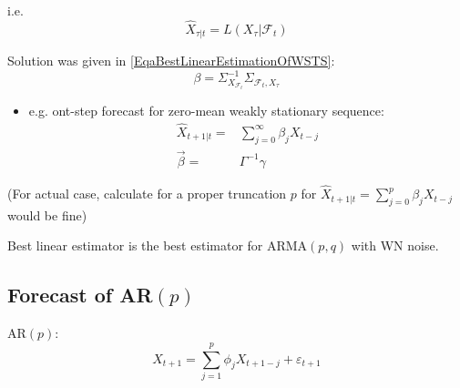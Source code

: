     i.e. 
    \begin{equation}
        \hat{X}_{\tau|t}=L(X_\tau|\mathscr{F}_t) 
    \end{equation}
    
    Solution was given in \autoref{EqaBestLinearEstimationOfWSTS}:
    \begin{equation}
        \beta =\Sigma _{X_{\mathscr{F}_t}}^{-1}\Sigma _{\mathscr{F}_t,X_{\tau}}
    \end{equation}

    \begin{itemize}[topsep=2pt,itemsep=0pt]
        \item e.g. ont-step forecast for zero-mean weakly stationary sequence:
    \begin{align}
        \hat{X}_{t+1|t}=&\sum_{j=0}^\infty \beta _jX_{t-j}\\
        \vec{\beta }=&\Gamma^{-1}\gamma 
    \end{align}
    \end{itemize}
    
    (For actual case, calculate for a proper truncation $ p $ for $ \hat{X}_{t+1|t}=\sum_{j=0}^p\beta _jX_{t-j} $ would be fine)
        
    

    Best linear estimator is the best estimator for ARMA$ (p,q) $ with WN noise.


    
    
\subsection{Forecast of AR$ (p) $}
    AR$ (p) $:
    \begin{equation}
        X_{t+1}=\sum_{j=1}^p\phi _jX_{t+1-j}+\varepsilon _{t+1}
    \end{equation}
    
